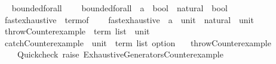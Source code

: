 \begin{isabellebody}
\isanewline
{}\isamarkupfalse%
%
\isadelimproof
\ %
\endisadelimproof
%
\isatagproof
\isacommand{{\isachardot}{\kern0pt}{\isachardot}{\kern0pt}}\isamarkupfalse%
%
\endisatagproof
{\isafoldproof}%
%
\isadelimproof
%
\endisadelimproof
\isanewline
\isanewline
{}\isamarkupfalse%
%
\isadelimdocument
%
\endisadelimdocument
%
\isatagdocument
%
\isamarkuptrue%
%
\endisatagdocument
{\isafolddocument}%
%
\isadelimdocument
%
\endisadelimdocument
{}\isamarkupfalse%
\ bounded{\isacharunderscore}{\kern0pt}forall\ {\isacharequal}{\kern0pt}\isanewline
\ \ \ bounded{\isacharunderscore}{\kern0pt}forall\ {\isacharcolon}{\kern0pt}{\isacharcolon}{\kern0pt}\ {\isachardoublequoteopen}{\isacharparenleft}{\kern0pt}{\isacharprime}{\kern0pt}a\ {\isasymRightarrow}\ bool{\isacharparenright}{\kern0pt}\ {\isasymRightarrow}\ natural\ {\isasymRightarrow}\ bool{\isachardoublequoteclose}%
\isadelimdocument
%
\endisadelimdocument
%
\isatagdocument
%
\isamarkuptrue%
%
\endisatagdocument
{\isafolddocument}%
%
\isadelimdocument
%
\endisadelimdocument
{}\isamarkupfalse%
\ fast{\isacharunderscore}{\kern0pt}exhaustive\ {\isacharequal}{\kern0pt}\ term{\isacharunderscore}{\kern0pt}of\ {\isacharplus}{\kern0pt}\isanewline
\ \ \ fast{\isacharunderscore}{\kern0pt}exhaustive\ {\isacharcolon}{\kern0pt}{\isacharcolon}{\kern0pt}\ {\isachardoublequoteopen}{\isacharparenleft}{\kern0pt}{\isacharprime}{\kern0pt}a\ {\isasymRightarrow}\ unit{\isacharparenright}{\kern0pt}\ {\isasymRightarrow}\ natural\ {\isasymRightarrow}\ unit{\isachardoublequoteclose}\isanewline
\isanewline
{}\isamarkupfalse%
\ throw{\isacharunderscore}{\kern0pt}Counterexample\ {\isacharcolon}{\kern0pt}{\isacharcolon}{\kern0pt}\ {\isachardoublequoteopen}term\ list\ {\isasymRightarrow}\ unit{\isachardoublequoteclose}\isanewline
{}\isamarkupfalse%
\ catch{\isacharunderscore}{\kern0pt}Counterexample\ {\isacharcolon}{\kern0pt}{\isacharcolon}{\kern0pt}\ {\isachardoublequoteopen}unit\ {\isasymRightarrow}\ term\ list\ option{\isachardoublequoteclose}\isanewline
\isanewline
{}\isamarkupfalse%
\isanewline
\ \ \ throw{\isacharunderscore}{\kern0pt}Counterexample\ {\isasymrightharpoonup}\isanewline
\ \ \ \ {\isacharparenleft}{\kern0pt}Quickcheck{\isacharparenright}{\kern0pt}\ {\isachardoublequoteopen}raise\ {\isacharparenleft}{\kern0pt}Exhaustive{\isacharprime}{\kern0pt}{\isacharunderscore}{\kern0pt}Generators{\isachardot}{\kern0pt}Counterexample\ {\isacharunderscore}{\kern0pt}{\isacharparenright}{\kern0pt}{\isachardoublequoteclose}\isanewline

\end{isabellebody}
